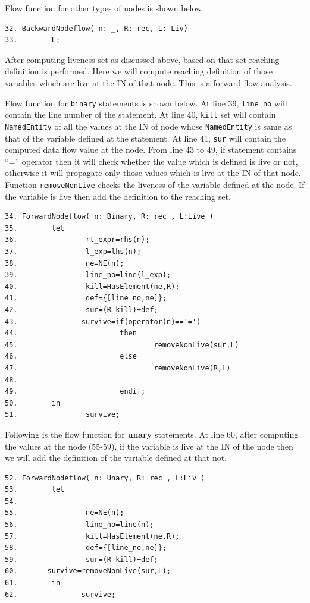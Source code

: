 \documentclass[11pt,a4paper,openright]{report}
\begin{document}
Flow function for other types of nodes is shown below.

\begin{lstlisting}
32. BackwardNodeflow( n: _, R: rec, L: Liv)
33.        L;
\end{lstlisting}


After computing liveness set as discussed above, based on that set reaching definition is performed. Here we will compute reaching definition of those
variables which are live at the IN of that node. This is a forward flow analysis.

Flow function for \texttt{binary} statements is shown below. At line 39, \texttt{line\_no} will contain the line number of the statement. At line 40,
\texttt{kill} set will contain \texttt{NamedEntity} of all the values at the IN of node whose \texttt{NamedEntity} is same as that of the variable defined at the statement.
At line 41, \texttt{sur} will contain the computed data flow value at the node. From line 43 to 49, if statement contains ``='' operator then it will 
check whether the value which is defined is live or not, otherwise it will propagate only those values which is live at the IN of that node. Function
\texttt{removeNonLive} checks the liveness of the variable defined at the node. If the variable is live then add the definition to the reaching set.

\begin{lstlisting}
34. ForwardNodeflow( n: Binary, R: rec , L:Live )
35.        let
36.                rt_expr=rhs(n);
37.                l_exp=lhs(n);
38.                ne=NE(n);
39.                line_no=line(l_exp);
40.                kill=HasElement(ne,R);
41.                def={[line_no,ne]};
42.                sur=(R-kill)+def;
43.               survive=if(operator(n)=='=')
44.                        then
45.                                removeNonLive(sur,L)
46.                        else
47.                                removeNonLive(R,L)
48.
49.                        endif;
50.        in
51.                survive;
\end{lstlisting}

Following is the flow function for \textbf{unary} statements. At line 60, after computing the values at the node (55-59), if the variable is live at the IN of the node
then we will add the definition of the variable defined at that not. 

\begin{lstlisting}
52. ForwardNodeflow( n: Unary, R: rec , L:Liv )
53.        let
54.                
55.                ne=NE(n);
56.                line_no=line(n);
57.                kill=HasElement(ne,R);
58.                def={[line_no,ne]};
59.                sur=(R-kill)+def;
60.		  survive=removeNonLive(sur,L);
61.        in
62.               survive;

\end{lstlisting}
\end{document}
